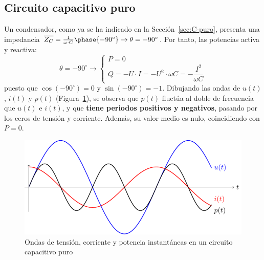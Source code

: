 	\subsection{Circuito capacitivo puro}\label{sec.potencia_C}
	Un condensador, como ya se ha indicado en la
        Sección~\ref{sec:C-puro}, presenta una impedancia
        $\overline{Z_C}=\frac{1}{\omega\cdot
          C}\phase{-90^\circ}\rightarrow \theta=-90^\circ$. Por tanto,
        las potencias activa y reactiva:
	\begin{equation}
          \theta = -90^\circ \rightarrow
          \boxed{\begin{cases}
            P = 0\\
            Q = -U\cdot I = -U^2\cdot \omega C = -\dfrac{I^2}{\omega C}
          \end{cases}}
      \end{equation}
      puesto que $\cos(-90^\circ)=0$ y $\sin(-90^\circ)=-1$. Dibujando
      las ondas de $u(t)$, $i(t)$ y $p(t)$
      (Figura~\ref{fig.capacitivoPotencia}), se observa que $p(t)$
      fluctúa al doble de frecuencia que $u(t)$ e $i(t)$, y que
      \textbf{tiene periodos positivos y negativos}, pasando por los
      ceros de tensión y corriente. Además, su valor medio es nulo,
      coincidiendo con $P=0$.
      \begin{figure}[H]
        \centering
        \includegraphics{../figs/capacitivoPuroPotencia.pdf}
        \caption{Ondas de tensión, corriente y potencia instantáneas
          en un circuito capacitivo puro}
        \label{fig.capacitivoPotencia}
      \end{figure}
	

